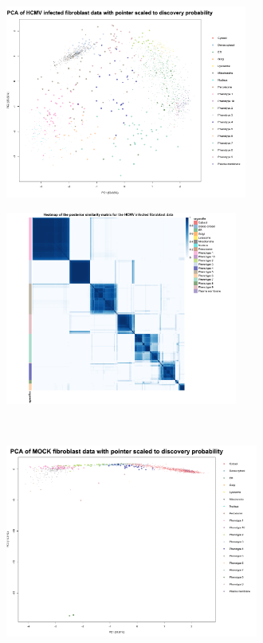 \documentclass[12pt,english]{article}
\begin{document}
\begin{figure}
\begin{subfigure}[t]{0.5\textwidth}
	\centering
	\includegraphics[height=2.5in]{pcaBeltranH.pdf}
	\caption{}
\end{subfigure}	
\begin{subfigure}[t]{0.5\textwidth}
	\centering
	\includegraphics[height=2.5in]{heatmapHCMV.pdf}
	\caption{}
\end{subfigure}
~
\begin{subfigure}[t]{0.5\textwidth}
	\centering
	\includegraphics[height=2.5in]{pcaMOCK.pdf}
	\caption{}
\end{subfigure}
\begin{subfigure}[t]{0.5\textwidth}

\end{subfigure}
\end{figure}
\end{document}

